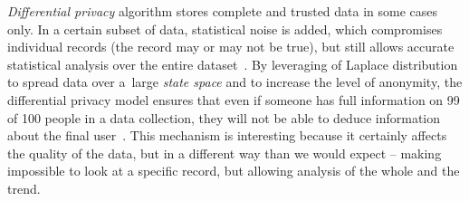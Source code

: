 \textit{Differential privacy} algorithm stores complete and trusted data in some cases only.
In a certain subset of data, statistical noise is added, which compromises individual records (the record may or may not be true), but still allows accurate statistical analysis over the entire dataset~\cite{difpriv2016}.
By leveraging of Laplace distribution to spread data over a~large \textit{state space} and to increase the level of anonymity, the differential privacy model ensures that even if someone has full information on 99 of 100 people in a data collection, they will not be able to deduce information about the final user~\cite{web:differential-privacy,dwork2014}.
This mechanism is interesting because it certainly affects the quality of the data, but in a different way than we would expect – making impossible to look at a specific record, but allowing analysis of the whole and the trend.











